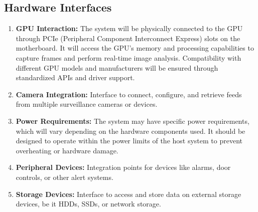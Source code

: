     \subsection{Hardware Interfaces}                
            \begin{enumerate}
                \item \textbf{GPU Interaction:} The system will be physically connected to the GPU through PCIe (Peripheral Component Interconnect Express) slots on the motherboard. It will access the GPU's memory and processing capabilities to capture frames and perform real-time image analysis. Compatibility with different GPU models and manufacturers will be ensured through standardized APIs and driver support.
                \item \textbf{Camera Integration:} Interface to connect, configure, and retrieve feeds from multiple surveillance cameras or devices.
                \item \textbf{Power Requirements:} The system may have specific power requirements, which will vary depending on the hardware components used. It should be designed to operate within the power limits of the host system to prevent overheating or hardware damage.
                \item \textbf{Peripheral Devices:} Integration points for devices like alarms, door controls, or other alert systems.
                \item \textbf{Storage Devices:} Interface to access and store data on external storage devices, be it HDDs, SSDs, or network storage.
            \end{enumerate}
    
